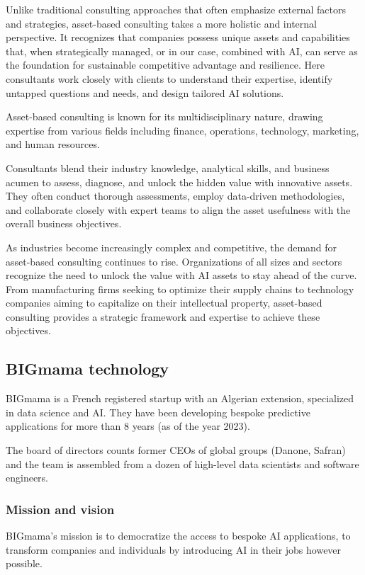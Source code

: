 \documentclass[a4paper,12pt]{article}
\begin{document}
Unlike traditional consulting approaches that often emphasize external factors and strategies, 
asset-based consulting takes a more holistic and internal perspective. 
It recognizes that companies possess unique assets and capabilities that, when strategically managed, or in our case, combined with AI, 
can serve as the foundation for sustainable competitive advantage and resilience. 
Here consultants work closely with clients to understand their expertise, identify untapped questions and needs, and design tailored AI solutions.

Asset-based consulting is known for its multidisciplinary nature, drawing expertise from various fields including finance, 
operations, technology, marketing, and human resources. 

Consultants blend their industry knowledge, analytical skills, and business acumen to assess, 
diagnose, and unlock the hidden value with innovative assets. They often conduct thorough assessments, employ data-driven methodologies, and collaborate closely with expert teams 
to align the asset usefulness with the overall business objectives.

As industries become increasingly complex and competitive, the demand for asset-based consulting continues to rise. 
Organizations of all sizes and sectors recognize the need to unlock the value with AI assets to stay ahead of the curve. 
From manufacturing firms seeking to optimize their supply chains to technology companies aiming to capitalize on their intellectual property, 
asset-based consulting provides a strategic framework and expertise to achieve these objectives.

\subsection{BIGmama technology}
BIGmama is a French registered startup with an Algerian extension, specialized in data science and AI. 
They have been developing bespoke predictive applications for more than 8 years (as of the year 2023).

The board of directors counts former CEOs of global groups (Danone, Safran) and the team is assembled from a dozen of high-level data scientists 
and software engineers.

\subsubsection{Mission and vision}
BIGmama's mission is to democratize the access to bespoke AI applications, to transform companies and individuals by introducing AI in their jobs however possible. 
\end{document}
